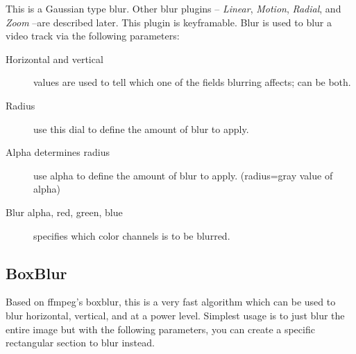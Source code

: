 This is a Gaussian type blur. Other blur plugins -- \textit{Linear}, \textit{Motion}, \textit{Radial}, and \textit{Zoom} --are described later. This plugin is keyframable. Blur is used to blur a video track via the following parameters:
\begin{description}
    \item[Horizontal and vertical] values are used to tell which one of the fields blurring affects; can be both.
    \item[Radius] use this dial to define the amount of blur to apply.
    \item[Alpha determines radius] use alpha to define the amount of blur to apply. (radius=gray value of alpha)
    \item[Blur alpha, red, green, blue] specifies which color channels is to be blurred.
\end{description}

\subsection{BoxBlur}%
\label{sub:boxblur}
Based on ffmpeg’s boxblur, this is a very fast algorithm which can be used to blur horizontal,
vertical, and at a power level.  Simplest usage is to just blur the entire image but with
the following parameters, you can create a specific rectangular section to blur instead.  

